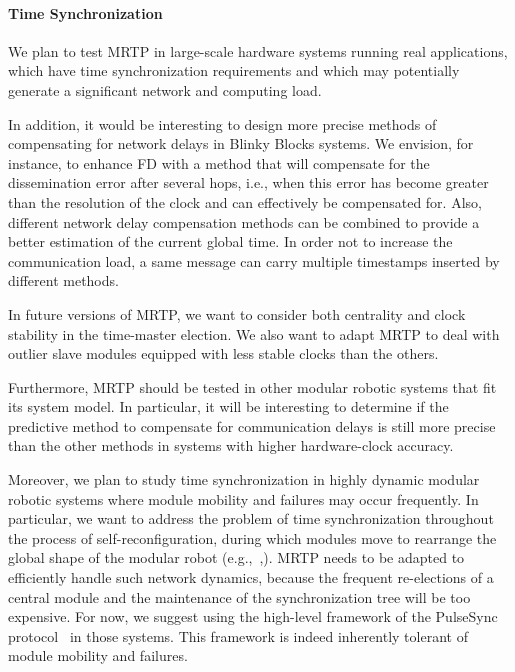 \paragraph{Time Synchronization}
We plan to test MRTP in large-scale hardware systems running real applications, which have time synchronization requirements and which may potentially generate a significant network and computing load.

In addition, it would be interesting to design more precise methods of compensating for network delays in Blinky Blocks systems. We envision, for instance, to enhance FD with a method that will compensate for the dissemination error after several hops, i.e., when this error has become greater than the resolution of the clock and can effectively be compensated for. Also, different network delay compensation methods can be combined to provide a better estimation of the current global time. In order not to increase the communication load, a same message can carry multiple timestamps inserted by different methods.

In future versions of MRTP, we want to consider both centrality and clock stability in the time-master election. We also want to adapt MRTP to deal with outlier slave modules equipped with less stable clocks than the others.

Furthermore, MRTP should be tested in other modular robotic systems that fit its system model. In particular, it will be interesting to determine if the predictive method to compensate for communication delays is still more precise than the other methods in systems with higher hardware-clock accuracy.

Moreover, we plan to study time synchronization in highly dynamic modular robotic systems where module mobility and failures may occur frequently. In particular, we want to address the problem of time synchronization throughout the process of self-reconfiguration, during which modules move to rearrange the global shape of the modular robot (e.g.,~\cite{pb16:ip},\cite{lakhlef2014optimization}). MRTP needs to be adapted to efficiently handle such network dynamics, because the frequent re-elections of a central module and the maintenance of the synchronization tree will be too expensive. For now, we suggest using the high-level framework of the PulseSync protocol~\cite{lenzen2015pulsesync} in those systems. This framework is indeed inherently tolerant of module mobility and failures.


